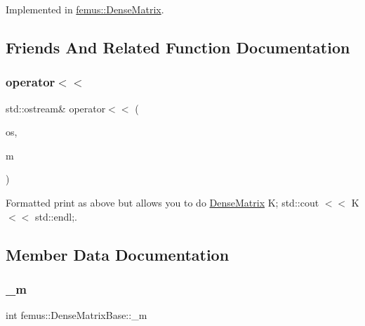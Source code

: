 Implemented in \mbox{\hyperlink{classfemus_1_1_dense_matrix_a865963674763716d720d6ef2c8177053}{femus\+::\+Dense\+Matrix}}.



\subsection{Friends And Related Function Documentation}
\mbox{\label{classfemus_1_1_dense_matrix_base_ad1683d9e1eacee7a0dd4507de51498c6}} 
\subsubsection{\texorpdfstring{operator$<$$<$}{operator<<}}
{\footnotesize\ttfamily std\+::ostream\& operator$<$$<$ (\begin{DoxyParamCaption}\item[{std\+::ostream \&}]{os,  }\item[{const \mbox{\hyperlink{classfemus_1_1_dense_matrix_base}{Dense\+Matrix\+Base}} \&}]{m }\end{DoxyParamCaption})\hspace{0.3cm}{\ttfamily [friend]}}



Formatted print as above but allows you to do \mbox{\hyperlink{classfemus_1_1_dense_matrix}{Dense\+Matrix}} K; std\+::cout $<$$<$ K $<$$<$ std\+::endl;. 



\subsection{Member Data Documentation}
\mbox{\label{classfemus_1_1_dense_matrix_base_ae7fb03cbc57d5b8b498456615348d246}} 
\subsubsection{\texorpdfstring{\+\_\+m}{\_m}}
{\footnotesize\ttfamily int femus\+::\+Dense\+Matrix\+Base\+::\+\_\+m\hspace{0.3cm}{\ttfamily [protected]}}



